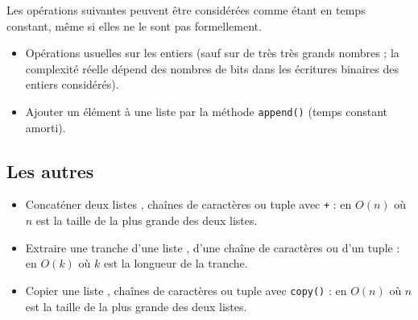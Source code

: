 Les opérations suivantes peuvent être considérées comme étant en temps constant, même si elles ne le sont pas formellement.

\begin{itemize}
  \item[\textbullet] Opérations usuelles sur les entiers (sauf sur de très très grands nombres ; la complexité réelle dépend des nombres de bits dans les écritures binaires des entiers considérés).
  \item[\textbullet] Ajouter un élément à une liste par la méthode \texttt{append()} (temps constant amorti).
\end{itemize}

\subsection{Les autres}

\begin{itemize}
  \item[\textbullet] Concaténer deux listes \python, chaînes de caractères ou tuple avec \texttt{+} : en $O(n)$ où $n$ est la taille de la plus grande des deux listes.
  \item[\textbullet] Extraire une tranche d'une liste \python, d'une chaîne de caractères ou d'un tuple : en $O(k)$ où $k$ est la longueur de la tranche.
  \item[\textbullet] Copier une liste \python, chaînes de caractères ou tuple avec \texttt{copy()} : en $O(n)$ où $n$ est la taille de la plus grande des deux listes.
\end{itemize}

